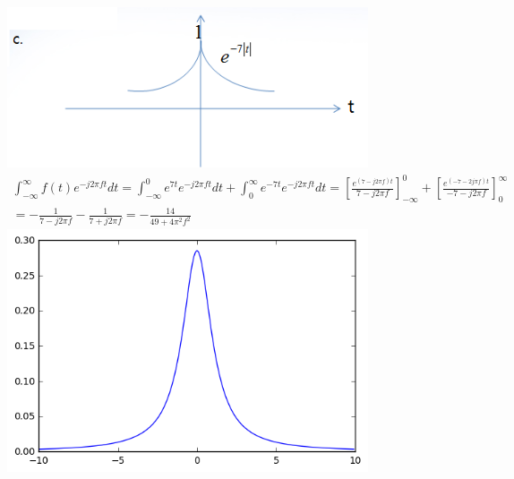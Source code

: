 \documentclass[12pt,a4paper]{article}
\begin{document}
\includegraphics[width=0.8\textwidth]{2.png}
\begin{gather*}
\int_{-\infty}^{\infty}f(t)e^{-j2\pi ft}dt
=\int_{-\infty}^{0}e^{7t}e^{-j2\pi ft}dt + \int_{0}^{\infty}e^{-7t}e^{-j2\pi ft}dt
=\left[\frac{e^{(7-j2\pi f)t}}{7-j2\pi f}\right]_{-\infty}^0
+\left[\frac{e^{(-7-2j\pi f)t}}{-7-j2\pi f}\right]_0^{\infty}\\
=-\frac{1}{7-j2\pi f} - \frac{1}{7+j2\pi f} = -\frac{14}{49+4\pi^2 f^2}
\end{gather*} 
\includegraphics[width=0.8\textwidth]{5.png}
\end{document}
